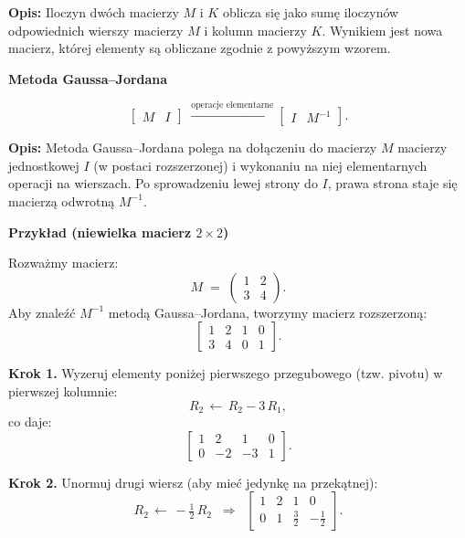 \vspace{1em}
\noindent
\textbf{Opis:} Iloczyn dwóch macierzy \( M \) i \( K \) oblicza się jako sumę iloczynów odpowiednich wierszy macierzy \( M \) i kolumn macierzy \( K \). Wynikiem jest nowa macierz, której elementy są obliczane zgodnie z powyższym wzorem.

\vspace{1em}
\noindent
\textbf{Metoda Gaussa--Jordana}


\[
\left[
\begin{array}{c|c}
M & I
\end{array}
\right]
\;\xrightarrow{\text{operacje elementarne}}
\left[
\begin{array}{c|c}
I & M^{-1}
\end{array}
\right].
\]

\vspace{1em}
\noindent
\textbf{Opis:} 
Metoda Gaussa--Jordana polega na dołączeniu do macierzy $M$ macierzy jednostkowej $I$ (w postaci rozszerzonej) i wykonaniu na niej elementarnych operacji na wierszach. Po sprowadzeniu lewej strony do $I$, prawa strona staje się macierzą odwrotną $M^{-1}$.


\textbf{Przykład (niewielka macierz $2 \times 2$)}

Rozważmy macierz:
\[
M \;=\;
\begin{pmatrix}
1 & 2 \\
3 & 4
\end{pmatrix}.
\]
Aby znaleźć $M^{-1}$ metodą Gaussa--Jordana, tworzymy macierz rozszerzoną:
\[
\left[
\begin{array}{cc|cc}
1 & 2 & 1 & 0 \\
3 & 4 & 0 & 1
\end{array}
\right].
\]

\noindent
\textbf{Krok 1.} Wyzeruj elementy poniżej pierwszego przegubowego (tzw. pivotu) w pierwszej kolumnie:
\[
R_2 \,\leftarrow\, R_2 - 3\,R_1,
\]
co daje:
\[
\left[
\begin{array}{cc|cc}
1 & 2 & 1 & 0 \\
0 & -2 & -3 & 1
\end{array}
\right].
\]

\noindent
\textbf{Krok 2.} Unormuj drugi wiersz (aby mieć jedynkę na przekątnej):
\[
R_2 \,\leftarrow\, -\tfrac12\,R_2
\;\;\Longrightarrow\;\;
\left[
\begin{array}{cc|cc}
1 & 2 & 1 & 0 \\
0 & 1 & \tfrac32 & -\tfrac12
\end{array}
\right].
\]

